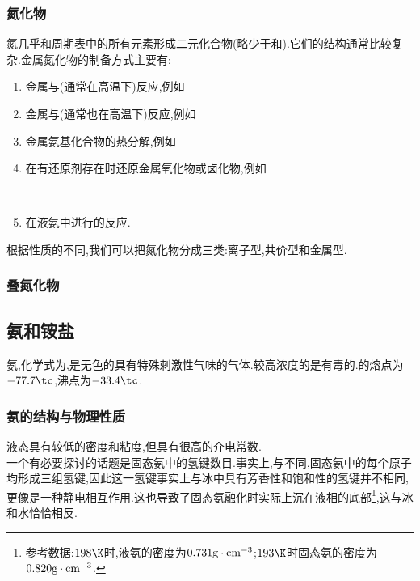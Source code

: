 \documentclass{ctexart}
\begin{document}
\subsubsection{氮化物}
氮几乎和周期表中的所有元素形成二元化合物(略少于和).它们的结构通常比较复杂.金属氮化物的制备方式主要有:
\begin{enumerate}[label=\tbf{\arabic*.},topsep=0pt,parsep=0pt,itemsep=0pt,partopsep=0pt]
    \item 金属与(通常在高温下)反应,例如
        \begin{center}
        \end{center}
    \item 金属与(通常也在高温下)反应,例如
        \begin{center}
        \end{center}
    \item 金属氨基化合物的热分解,例如
        \begin{center}
        \end{center}
    \item 在有还原剂存在时还原金属氧化物或卤化物,例如
        \begin{center}
            \\
        \end{center}
    \item 在液氨中进行的反应.
\end{enumerate}
根据性质的不同,我们可以把氮化物分成三类:离子型,共价型和金属型.
\subsubsection{叠氮化物}
\subsection{氨和铵盐}
\begin{substance}[\ce{NH3}]
    氨,化学式为,是无色的具有特殊刺激性气味的气体.较高浓度的是有毒的.的熔点为$-77.7\tc$,沸点为$-33.4\tc$.
\end{substance}
\subsubsection{氨的结构与物理性质}
液态具有较低的密度和粘度,但具有很高的介电常数.\\
\indent 一个有必要探讨的话题是固态氨中的氢键数目.事实上,与不同,固态氨中的每个原子均形成三组氢键,因此这一氢键事实上与冰中具有芳香性和饱和性的氢键并不相同,更像是一种静电相互作用.这也导致了固态氨融化时实际上沉在液相的底部\footnote{参考数据:$198\K$时,液氨的密度为$0.731\text g\cdot\text{cm}^{-3}$;$193\K$时固态氨的密度为$0.820\text g\cdot\text{cm}^{-3}$.},这与冰和水恰恰相反.
\end{document}
